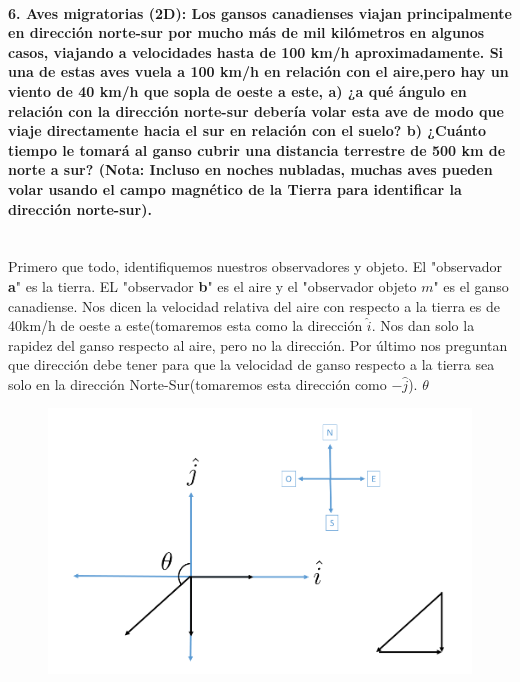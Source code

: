 \documentclass[a4paper,11pt]{article}
\theoremstyle{mytheor}
\begin{document}
 \paragraph{6. Aves migratorias (2D): Los gansos canadienses viajan principalmente en dirección norte-sur por mucho más de mil kilómetros en
 algunos casos, viajando a velocidades hasta de 100 km/h aproximadamente. Si una de estas aves vuela a 100 km/h en relación con el aire,pero hay un viento de 40 km/h que sopla de oeste a este, a) ¿a qué
 ángulo en relación con la dirección norte-sur debería volar esta ave
 de modo que viaje directamente hacia el sur en relación con el suelo?
 b) ¿Cuánto tiempo le tomará al ganso cubrir una distancia terrestre de
 500 km de norte a sur? (Nota: Incluso en noches nubladas, muchas
 aves pueden volar usando el campo magnético de la Tierra para identificar la dirección norte-sur).\\
 \\}


Primero que todo, identifiquemos nuestros observadores y objeto. El "observador \textbf{a}" es la tierra. EL "observador \textbf{b}" es el aire y el "observador objeto $m$" es el ganso canadiense. Nos dicen la velocidad relativa del aire con respecto a la tierra es de 40km/h de oeste a este(tomaremos esta como la dirección $\hat{i}$. Nos dan solo la rapidez del ganso respecto al aire, pero no la dirección. Por último nos preguntan que dirección debe tener para que la velocidad de ganso respecto a la tierra sea solo en la dirección Norte-Sur(tomaremos esta dirección como $-\hat{j}$).  $\theta$ 





\begin{figure}[h]
	\includegraphics[width=1.0\linewidth]{4}
	\label{fcN4}
\end{figure}
\end{document}

